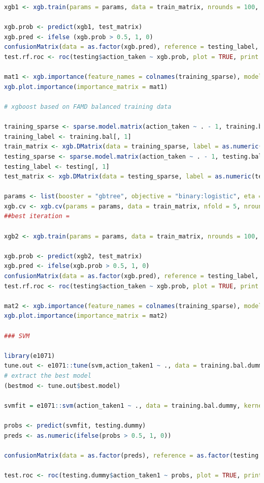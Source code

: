 \documentclass{jpp}
\begin{document}
\begin{lstlisting}[language=R]
xgb1 <- xgb.train(params = params, data = train_matrix, nrounds = 100, watchlist = list(val = test_matrix, train=train_matrix), print_every_n = 10, early_stop_round = 10, maximize = F , eval_metric = "error")

xgb.prob <- predict(xgb1, test_matrix)
xgb.pred <- ifelse (xgb.prob > 0.5, 1, 0)
confusionMatrix(data = as.factor(xgb.pred), reference = testing_label, positive = "1")
test.rf.roc <- roc(testing$action_taken ~ xgb.prob, plot = TRUE, print.auc = TRUE)

mat1 <- xgb.importance(feature_names = colnames(training_sparse), model = xgb1)
xgb.plot.importance(importance_matrix = mat1)

# xgboost based on FAMD balanced training data

training_sparse <- sparse.model.matrix(action_taken ~ . - 1, training.bal.FAMD)
training_label <- training.bal[, 1]
train_matrix <- xgb.DMatrix(data = training_sparse, label = as.numeric(training_label) - 1)
testing_sparse <- sparse.model.matrix(action_taken ~ . - 1, testing.bal.FAMD)
testing_label <- testing[, 1]
test_matrix <- xgb.DMatrix(data = testing_sparse, label = as.numeric(testing_label) - 1)

params <- list(booster = "gbtree", objective = "binary:logistic", eta = 0.3, gamma = 0, max_depth = 6, min_child_weight = 1, subsample = 1, colsample_bytree = 1)
xgb.cv <- xgb.cv(params = params, data = train_matrix, nfold = 5, nrounds = 100)
##best iteration =

xgb2 <- xgb.train(params = params, data = train_matrix, nrounds = 100, watchlist = list(val = test_matrix, train=train_matrix), print_every_n = 10, early_stop_round = 10, maximize = F , eval_metric = "error")

xgb.prob <- predict(xgb2, test_matrix)
xgb.pred <- ifelse(xgb.prob > 0.5, 1, 0)
confusionMatrix(data = as.factor(xgb.pred), reference = testing_label, positive = "1")
test.rf.roc <- roc(testing$action_taken ~ xgb.prob, plot = TRUE, print.auc = TRUE)

mat2 <- xgb.importance(feature_names = colnames(training_sparse), model = xgb2)
xgb.plot.importance(importance_matrix = mat2)

### SVM

library(e1071)
tune.out <- e1071::tune(svm,action_taken1 ~ ., data = training.bal.dummy, kernel = "linear", ranges = list(cost = c(0.001, 0.01, 0.1, 1, 5, 10, 100)))
# extract the best model
(bestmod <- tune.out$best.model)

svmfit = e1071::svm(action_taken1 ~ ., data = training.bal.dummy, kernel = "linear", cost = 0.001, scale = FALSE)

probs <- predict(svmfit, testing.dummy)
preds <- as.numeric(ifelse(probs > 0.5, 1, 0))

confusionMatrix(data = as.factor(preds), reference = as.factor(testing.dummy$action_taken1), positive = "1")

test.roc <- roc(testing.dummy$action_taken1 ~ probs, plot = TRUE, print.auc = TRUE)
\end{lstlisting}
\end{document}
